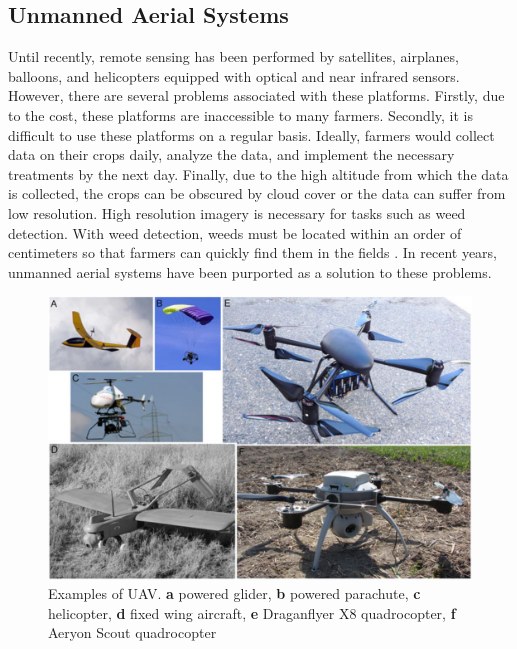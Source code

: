 \subsection{Unmanned Aerial Systems}
Until recently, remote sensing has been performed by satellites, airplanes, balloons, and helicopters equipped with optical and near infrared sensors. However, there are several problems associated with these platforms. Firstly, due to the cost, these platforms are inaccessible to many farmers. Secondly, it is difficult to use these platforms on a regular basis. Ideally, farmers would collect data on their crops daily, analyze the data, and implement the necessary treatments by the next day. Finally, due to the high altitude from which the data is collected, the crops can be obscured by cloud cover or the data can suffer from low resolution. High resolution imagery is necessary for tasks such as weed detection. With weed detection, weeds must be located within an order of centimeters so that farmers can quickly find them in the fields \cite{Zhang2012}. In recent years, unmanned aerial systems have been purported as a solution to these problems.

\begin{figure}
    \centering
    \includegraphics[width=1.0\textwidth]{images/uav.png}
    \caption{Examples of UAV. \textbf{a} powered glider, \textbf{b} powered parachute, \textbf{c} helicopter, \textbf{d} fixed wing aircraft, \textbf{e} Draganflyer X8 quadrocopter, \textbf{f} Aeryon Scout quadrocopter \cite{Zhang2012}}
    \label{UAV}
\end{figure}

